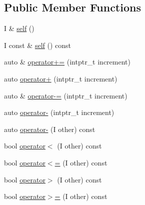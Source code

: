 \subsection*{Public Member Functions}
\begin{DoxyCompactItemize}
\item 
I \& \mbox{\hyperlink{structrah_1_1iterator__facade_3_01_i_00_01_r_00_01std_1_1random__access__iterator__tag_01_4_af615854ffd8e6fee76b721b22082083a}{self}} ()
\item 
I const  \& \mbox{\hyperlink{structrah_1_1iterator__facade_3_01_i_00_01_r_00_01std_1_1random__access__iterator__tag_01_4_a166a2cf8556d9ceab0f13c25a8479d68}{self}} () const
\item 
auto \& \mbox{\hyperlink{structrah_1_1iterator__facade_3_01_i_00_01_r_00_01std_1_1random__access__iterator__tag_01_4_a57ed10cbef4737afed6fe528153242d4}{operator+=}} (intptr\+\_\+t increment)
\item 
auto \mbox{\hyperlink{structrah_1_1iterator__facade_3_01_i_00_01_r_00_01std_1_1random__access__iterator__tag_01_4_a83aedd8f19e900b6e88738983019d397}{operator+}} (intptr\+\_\+t increment)
\item 
auto \& \mbox{\hyperlink{structrah_1_1iterator__facade_3_01_i_00_01_r_00_01std_1_1random__access__iterator__tag_01_4_afb47b6bc9a78b8ada27a9e6762490509}{operator-\/=}} (intptr\+\_\+t increment)
\item 
auto \mbox{\hyperlink{structrah_1_1iterator__facade_3_01_i_00_01_r_00_01std_1_1random__access__iterator__tag_01_4_aee5b793dd95cd2982ac0308525b9a7dd}{operator-\/}} (intptr\+\_\+t increment)
\item 
auto \mbox{\hyperlink{structrah_1_1iterator__facade_3_01_i_00_01_r_00_01std_1_1random__access__iterator__tag_01_4_ae8ed48020abfa623caadbd66250709e8}{operator-\/}} (I other) const
\item 
bool \mbox{\hyperlink{structrah_1_1iterator__facade_3_01_i_00_01_r_00_01std_1_1random__access__iterator__tag_01_4_a66e4bfae3597e0979bac8e8c01f2ea1d}{operator$<$}} (I other) const
\item 
bool \mbox{\hyperlink{structrah_1_1iterator__facade_3_01_i_00_01_r_00_01std_1_1random__access__iterator__tag_01_4_ae4083d1a2e06f942cc4c3dd9c9e6b253}{operator$<$=}} (I other) const
\item 
bool \mbox{\hyperlink{structrah_1_1iterator__facade_3_01_i_00_01_r_00_01std_1_1random__access__iterator__tag_01_4_ae540df5bae946be7133f516ac9b086f6}{operator$>$}} (I other) const
\item 
bool \mbox{\hyperlink{structrah_1_1iterator__facade_3_01_i_00_01_r_00_01std_1_1random__access__iterator__tag_01_4_a93a69c815419553734a4acecba4b570c}{operator$>$=}} (I other) const

\end{DoxyCompactItemize}
